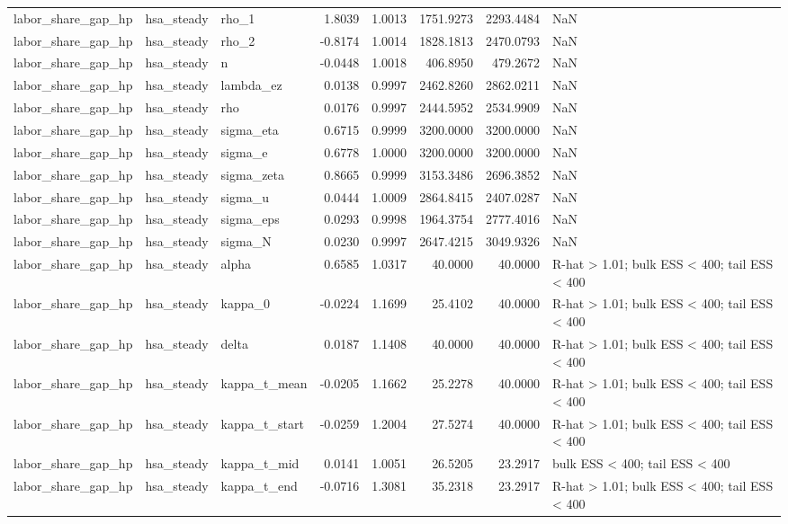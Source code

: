 \begin{tabular}{lllrrrrl}
labor\_share\_gap\_hp & hsa\_steady & rho\_1 & 1.8039 & 1.0013 & 1751.9273 & 2293.4484 & NaN \\
labor\_share\_gap\_hp & hsa\_steady & rho\_2 & -0.8174 & 1.0014 & 1828.1813 & 2470.0793 & NaN \\
labor\_share\_gap\_hp & hsa\_steady & n & -0.0448 & 1.0018 & 406.8950 & 479.2672 & NaN \\
labor\_share\_gap\_hp & hsa\_steady & lambda\_ez & 0.0138 & 0.9997 & 2462.8260 & 2862.0211 & NaN \\
labor\_share\_gap\_hp & hsa\_steady & rho & 0.0176 & 0.9997 & 2444.5952 & 2534.9909 & NaN \\
labor\_share\_gap\_hp & hsa\_steady & sigma\_eta & 0.6715 & 0.9999 & 3200.0000 & 3200.0000 & NaN \\
labor\_share\_gap\_hp & hsa\_steady & sigma\_e & 0.6778 & 1.0000 & 3200.0000 & 3200.0000 & NaN \\
labor\_share\_gap\_hp & hsa\_steady & sigma\_zeta & 0.8665 & 0.9999 & 3153.3486 & 2696.3852 & NaN \\
labor\_share\_gap\_hp & hsa\_steady & sigma\_u & 0.0444 & 1.0009 & 2864.8415 & 2407.0287 & NaN \\
labor\_share\_gap\_hp & hsa\_steady & sigma\_eps & 0.0293 & 0.9998 & 1964.3754 & 2777.4016 & NaN \\
labor\_share\_gap\_hp & hsa\_steady & sigma\_N & 0.0230 & 0.9997 & 2647.4215 & 3049.9326 & NaN \\
labor\_share\_gap\_hp & hsa\_steady & alpha & 0.6585 & 1.0317 & 40.0000 & 40.0000 & R-hat > 1.01; bulk ESS < 400; tail ESS < 400 \\
labor\_share\_gap\_hp & hsa\_steady & kappa\_0 & -0.0224 & 1.1699 & 25.4102 & 40.0000 & R-hat > 1.01; bulk ESS < 400; tail ESS < 400 \\
labor\_share\_gap\_hp & hsa\_steady & delta & 0.0187 & 1.1408 & 40.0000 & 40.0000 & R-hat > 1.01; bulk ESS < 400; tail ESS < 400 \\
labor\_share\_gap\_hp & hsa\_steady & kappa\_t\_mean & -0.0205 & 1.1662 & 25.2278 & 40.0000 & R-hat > 1.01; bulk ESS < 400; tail ESS < 400 \\
labor\_share\_gap\_hp & hsa\_steady & kappa\_t\_start & -0.0259 & 1.2004 & 27.5274 & 40.0000 & R-hat > 1.01; bulk ESS < 400; tail ESS < 400 \\
labor\_share\_gap\_hp & hsa\_steady & kappa\_t\_mid & 0.0141 & 1.0051 & 26.5205 & 23.2917 & bulk ESS < 400; tail ESS < 400 \\
labor\_share\_gap\_hp & hsa\_steady & kappa\_t\_end & -0.0716 & 1.3081 & 35.2318 & 23.2917 & R-hat > 1.01; bulk ESS < 400; tail ESS < 400 \\

\end{tabular}

